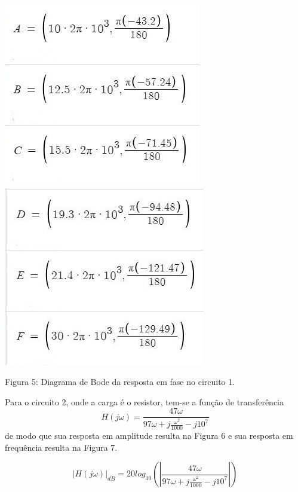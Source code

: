 \documentclass[a4 paper]{article}
\begin{document}
\begin{table}[hb]
\centering
\includegraphics[scale=0.5]{figuras/pontosfase1-1}\includegraphics[scale=0.5]{figuras/pontosfase1}
\end{table}
\begin{center}
Figura 5: Diagrama de Bode da resposta em fase no circuito 1.
\end{center}

Para o circuito 2, onde a carga é o resistor, tem-se a função de transferência $$H(j\omega)=\frac{47\omega}{97\omega+j\frac{\omega^2}{1000}-j10^7}$$ de modo que sua resposta em amplitude resulta na Figura 6 e sua resposta em frequência resulta na Figura 7.

\[|H(j\omega)|_{dB} = 20log_{10}\left(\left|\frac{47\omega}{97\omega+j\frac{\omega^2}{1000}-j10^7}\right|\right)\]
\end{document}
